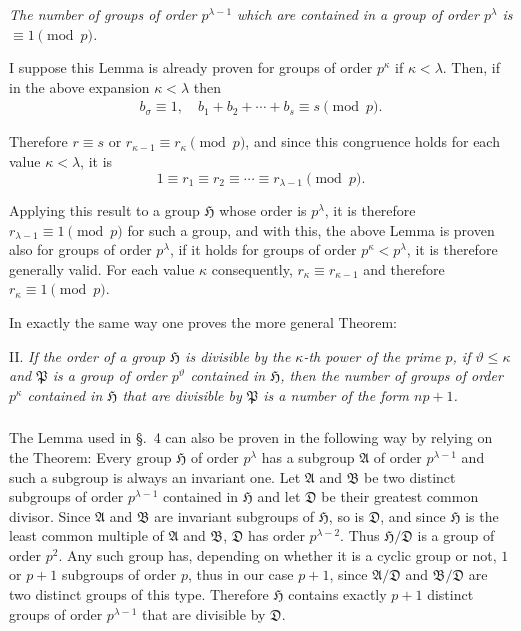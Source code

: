 \documentclass[a5paper,12pt]{article}
\newcommand{\secformat}[1]{\centering{\normalfont\normalsize{#1}}}
\let\fr\mathfrak
\newcommand{\CA}{\fr{A}}
\newcommand{\CB}{\fr{B}}
\newcommand{\CD}{\fr{D}}
\newcommand{\CH}{\fr{H}}
\newcommand{\CP}{\fr{P}}
\newcommand{\?}{{\color{blue}${}^{(?)}$}}
\begin{document}
\emph{The number of groups of order $p^{\lambda-1}$
which are contained in a group of order $p^\lambda$
is $\equiv 1 \pmod{p}$.}


I suppose this Lemma is already proven
for groups of order $p^\kappa$ if $\kappa < \lambda$.
%
%
Then,
if in the above expansion $\kappa < \lambda$
then
\begin{align} \label{e:4-6} \tag{6.}
	b_\sigma \equiv 1,
	\quad
	b_1 + b_2 + \cdots + b_s \equiv s
	\pmod{p}.
\end{align}


Therefore $r \equiv s$ or $r_{\kappa-1} \equiv r_\kappa \pmod{p}$,
and since this congruence
holds for each value $\kappa < \lambda$,
it is
\[
	1 \equiv r_1 \equiv r_2 \equiv \cdots \equiv r_{\lambda-1}
	\pmod{p}
	.
\]


Applying this result
to a group $\CH$
whose order is $p^\lambda$,
it is therefore
$r_{\lambda-1} \equiv 1 \pmod{p}$
for such a group,
and
with this,
the above Lemma is proven
also for groups of order $p^\lambda$,
if it holds
for groups of order $p^\kappa < p^\lambda$,
it is therefore generally valid.
%
%
For each value $\kappa$
consequently,
$r_\kappa \equiv r_{\kappa-1}$
and
therefore
$r_\kappa \equiv 1 \pmod{p}$.


In exactly the same way
one proves the more general Theorem:


II.
%
\label{t:4-2}
%
\emph{ %
If the order of a group $\CH$
is divisible by the $\kappa$-th power
of the prime $p$,
if $\vartheta \leq \kappa$
and
$\CP$ is a group of order $p^\vartheta$
contained in $\CH$,
then
the number of groups of order $p^\kappa$
contained in $\CH$
that are divisible by $\CP$
is a number of the form $n p + 1$.
}



\subsubsection*{\secformat{\S.~5.}}


The Lemma used in \S.~4
can also be proven
in the following way
by relying on the Theorem:
%
%
Every group $\CH$ of order $p^\lambda$
has a subgroup $\CA$ of order $p^{\lambda-1}$
and such a subgroup
is always an invariant one.
%
%
Let $\CA$ and $\CB$ be
two distinct subgroups of order $p^{\lambda-1}$
contained in $\CH$
and
let $\CD$ be their greatest common divisor.
%
%
Since $\CA$ and $\CB$ are invariant subgroups of $\CH$,
so is $\CD$,
and
since $\CH$ is the least common multiple of $\CA$ and $\CB$,
$\CD$ has order $p^{\lambda-2}$.
%
%
Thus
$\CH / \CD$ is a group of order $p^2$.
%
%
Any such group has,
depending on whether
it is a cyclic group or not,
$1$ or $p+1$
subgroups of order $p$,
thus in our case
$p + 1$,
since $\CA / \CD$ and $\CB / \CD$
are two distinct groups of this type.
%
%
Therefore
$\CH$ contains exactly $p + 1$
distinct groups of order $p^{\lambda-1}$
that are divisible by $\CD$.
\end{document}
